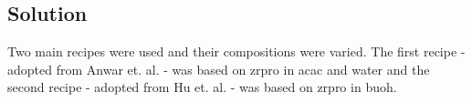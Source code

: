 \documentclass[a4paper]{article}
\begin{document}

\subsection{Solution}
Two main recipes were used and their compositions were varied. 
The first recipe - adopted from Anwar et. al. \cite{Anwar2017} - was based on \gls{zrpro} in \gls{acac} and \gls{water} 
and the second recipe - 
adopted from Hu et. al. \cite{Hu2016} -
was based on \gls{zrpro} in \gls{buoh}.
\end{document}
